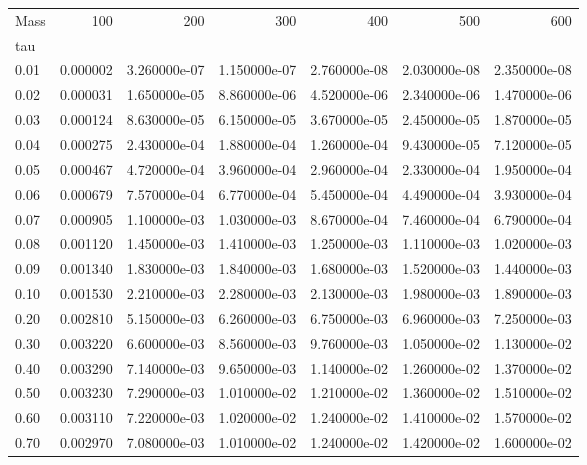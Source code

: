 \begin{tabular}{lrrrrrr}
\toprule
Mass &       100 &           200 &           300 &           400 &           500 &           600 \\
tau   &           &               &               &               &               &               \\
\midrule
0.01  &  0.000002 &  3.260000e-07 &  1.150000e-07 &  2.760000e-08 &  2.030000e-08 &  2.350000e-08 \\
0.02  &  0.000031 &  1.650000e-05 &  8.860000e-06 &  4.520000e-06 &  2.340000e-06 &  1.470000e-06 \\
0.03  &  0.000124 &  8.630000e-05 &  6.150000e-05 &  3.670000e-05 &  2.450000e-05 &  1.870000e-05 \\
0.04  &  0.000275 &  2.430000e-04 &  1.880000e-04 &  1.260000e-04 &  9.430000e-05 &  7.120000e-05 \\
0.05  &  0.000467 &  4.720000e-04 &  3.960000e-04 &  2.960000e-04 &  2.330000e-04 &  1.950000e-04 \\
0.06  &  0.000679 &  7.570000e-04 &  6.770000e-04 &  5.450000e-04 &  4.490000e-04 &  3.930000e-04 \\
0.07  &  0.000905 &  1.100000e-03 &  1.030000e-03 &  8.670000e-04 &  7.460000e-04 &  6.790000e-04 \\
0.08  &  0.001120 &  1.450000e-03 &  1.410000e-03 &  1.250000e-03 &  1.110000e-03 &  1.020000e-03 \\
0.09  &  0.001340 &  1.830000e-03 &  1.840000e-03 &  1.680000e-03 &  1.520000e-03 &  1.440000e-03 \\
0.10  &  0.001530 &  2.210000e-03 &  2.280000e-03 &  2.130000e-03 &  1.980000e-03 &  1.890000e-03 \\
0.20  &  0.002810 &  5.150000e-03 &  6.260000e-03 &  6.750000e-03 &  6.960000e-03 &  7.250000e-03 \\
0.30  &  0.003220 &  6.600000e-03 &  8.560000e-03 &  9.760000e-03 &  1.050000e-02 &  1.130000e-02 \\
0.40  &  0.003290 &  7.140000e-03 &  9.650000e-03 &  1.140000e-02 &  1.260000e-02 &  1.370000e-02 \\
0.50  &  0.003230 &  7.290000e-03 &  1.010000e-02 &  1.210000e-02 &  1.360000e-02 &  1.510000e-02 \\
0.60  &  0.003110 &  7.220000e-03 &  1.020000e-02 &  1.240000e-02 &  1.410000e-02 &  1.570000e-02 \\
0.70  &  0.002970 &  7.080000e-03 &  1.010000e-02 &  1.240000e-02 &  1.420000e-02 &  1.600000e-02 \\

\end{tabular}
